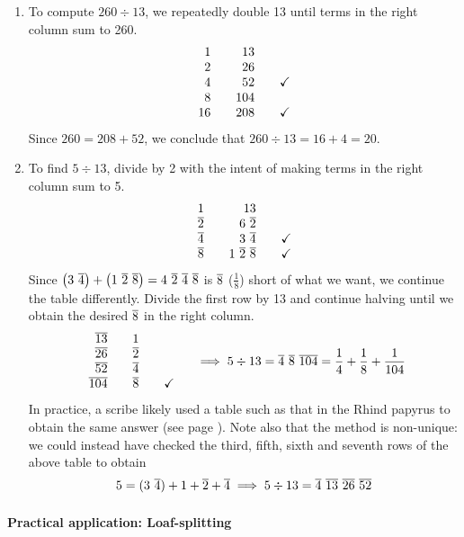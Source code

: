 \begin{enumerate}
	\item To compute $260\div 13$, we repeatedly double 13 until terms in the right column sum to 260.
	\[
		\begin{array}{r@{\qquad}r@{\qquad}c}
			1&13\\
			2&26\\
			4&52&\checkmark\\
			8&104\\
			16&208&\checkmark
		\end{array}
	\]
	Since $260=208+52$, we conclude that $260\div 13=16+4=20$.


	\item To find $5\div 13$, divide by 2 with the intent of making terms in the right column sum to 5.
	\[
		\begin{array}{r@{\qquad}r@{\qquad}c}
1&13\\
			\cl 2&6\ \cl 2\\
			\cl 4&3\ \cl 4&\checkmark\\
			\cl 8&1\ \cl 2\ \cl 8&\checkmark
		\end{array}
	\]
	Since $\big(3\ \cl 4\big)+\big(1\ \cl 2\ \cl 8\big) =4\ \cl 2\ \cl 4\ \cl 8$ is $\overline{8}$ ($\frac 18$) short of what we want, we continue the table differently. Divide the first row by 13 and continue halving until we obtain the desired $\overline{8}$ in the right column.
	\[
		\begin{array}{r@{\qquad}r@{\qquad}c}
			\cl{13}&1\\
			\cl{26}&\cl 2\\
			\cl{52}&\cl 4\\
			\cl{104}&\cl 8&\checkmark
		\end{array}
		\quad\implies 5\div 13=\cl 4\ \cl 8\ \cl{104} =\frac 14+\frac 18+\frac 1{104}
	\]
	In practice, a scribe likely used a table such as that in the Rhind papyrus to obtain the same answer (see page \pageref{ex:rhinddivide}). Note also that the method is non-unique: we could instead have checked the third, fifth, sixth and seventh rows of the above table to obtain
	\[
		5=(3\ \overline{4})+1+\overline{2}+\overline{4}\implies 5\div 13=\overline{4}\ \overline{13}\ \overline{26}\ \overline{52}
	\]
\end{enumerate}


\paragraph{Practical application: Loaf-splitting}

